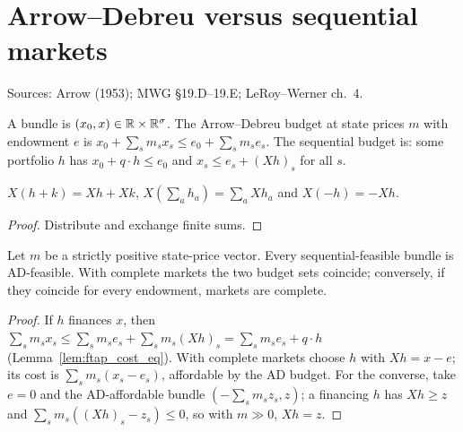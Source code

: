 \section{Arrow--Debreu versus sequential markets}
\label{sec:seqmarkets}

Sources: Arrow (1953); MWG \S19.D--19.E; LeRoy--Werner ch.~4.

\begin{definition}
\label{def:seq_budgets}
\leanok
{}
A bundle is $(x_0, x) \in \mathbb{R} \times \mathbb{R}^\sigma$. The Arrow--Debreu budget at state prices $m$ with endowment $e$ is
$x_0 + \sum_sm_sx_s \le e_0 + \sum_sm_se_s$. The sequential budget is: some portfolio $h$ has $x_0 + q\cdot h \le e_0$
and $x_s \le e_s + (Xh)_s$ for all $s$.
\end{definition}

\begin{lemma}
\label{lem:seq_payoff}
\leanok
{}
$X(h + k) = Xh + Xk$, $X(\sum_ah_a) = \sum_aXh_a$ and $X(-h) = -Xh$.
\end{lemma}
\begin{proof}
\leanok
Distribute and exchange finite sums.
\end{proof}

\begin{theorem}
\label{thm:seq_budget}
\leanok
{}
Let $m$ be a strictly positive state-price vector. Every sequential-feasible bundle is AD-feasible. With complete
markets the two budget sets coincide; conversely, if they coincide for every endowment, markets are complete.
\end{theorem}
\begin{proof}
\leanok
If $h$ finances $x$, then $\sum_sm_sx_s \le \sum_sm_se_s + \sum_sm_s(Xh)_s = \sum_sm_se_s + q\cdot h$
(Lemma~\ref{lem:ftap_cost_eq}). With complete markets choose $h$ with $Xh = x - e$; its cost is
$\sum_sm_s(x_s - e_s)$, affordable by the AD budget. For the converse, take $e = 0$ and the AD-affordable bundle
$(-\sum_sm_sz_s, z)$; a financing $h$ has $Xh \ge z$ and $\sum_sm_s((Xh)_s - z_s) \le 0$, so with $m \gg 0$,
$Xh = z$.
\end{proof}

